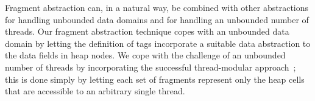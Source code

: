 Fragment abstraction can, in a natural way,
be combined with other abstractions for
handling unbounded data domains and for handling an unbounded number of threads.
Our fragment abstraction technique copes with an unbounded data domain by
letting the definition of tags incorporate
a suitable data abstraction to the data fields in heap nodes.
We cope with the challenge of an unbounded number of threads by incorporating
the successful thread-modular approach~\cite{BLMRS:cav08}; this is done
simply by letting each set of fragments represent only the heap cells that
are accessible to an arbitrary single thread.




